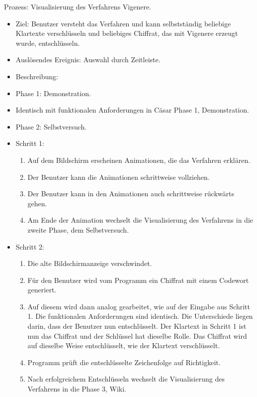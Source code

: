 \documentclass{article}
\begin{document}

\begin{FA}[start=120]
 \item Prozess: Visualisierung des Verfahrens Vigenere.
\end{FA}
\begin{itemize}[label={}]

 \item Ziel: Benutzer versteht das Verfahren und kann selbstständig beliebige Klartexte verschlüsseln und beliebiges Chiffrat, das mit Vigenere erzeugt wurde, entschlüsseln.

 \item Auslösendes Ereignis: Auswahl durch Zeitleiste.

 \item Beschreibung:

 \item Phase 1: Demonstration.

 \item Identisch mit funktionalen Anforderungen in Cäsar Phase 1, Demonstration. 

 \item Phase 2: Selbstversuch.

 \item Schritt 1:

	\begin{enumerate}
	 \item Auf dem Bildschirm erscheinen Animationen, die das Verfahren erklären.
	 \item Der Benutzer kann die Animationen schrittweise vollziehen.
	 \item Der Benutzer kann in den Animationen auch schrittweise rückwärts gehen. 
	 \item Am Ende der Animation wechselt die Visualisierung des Verfahrens in die zweite Phase, dem Selbstversuch.
	\end{enumerate}

 \item Schritt 2:

	\begin{enumerate}
	 \item Die alte Bildschirmanzeige verschwindet.
	 \item Für den Benutzer wird vom Programm ein Chiffrat mit einem Codewort generiert. 
	 \item[] Auf diesem wird dann analog gearbeitet, wie auf der Eingabe aus Schritt 1. Die 
funktionalen Anforderungen sind identisch. Die Unterschiede liegen darin, dass der Benutzer 
nun entschlüsselt. Der Klartext in Schritt 1 ist nun das Chiffrat und der Schlüssel hat 
dieselbe Rolle. Das Chiffrat wird auf dieselbe Weise entschlüsselt, wie der Klartext verschlüsselt. 
	 \item Programm prüft die entschlüsselte Zeichenfolge auf Richtigkeit.
	 \item Nach erfolgreichem Entschlüsseln wechselt die Visualisierung des Verfahrens in die Phase 3, Wiki.
	\end{enumerate}


\end{itemize}
\end{document}
